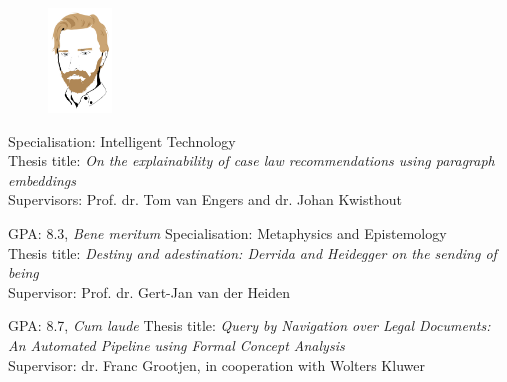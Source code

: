 \documentclass{cv}
\begin{document}
\begin{figure}
	\vspace*{-5em}
	\includegraphics[width=0.15\textwidth]{img/ejw.jpg}
\end{figure}

\baselinestretch


\sepspace





{Specialisation: Intelligent Technology\\
Thesis title: \emph{On the explainability of case law recommendations using paragraph embeddings}\\
Supervisors: Prof. dr. Tom van Engers and dr. Johan Kwisthout}

{GPA: 8.3, \emph{Bene meritum}}
{Specialisation: Metaphysics and Epistemology\\
Thesis title: \emph{Destiny and adestination: Derrida and Heidegger on the sending of being}\\
Supervisor: Prof. dr. Gert-Jan van der Heiden}

{GPA: 8.7, \emph{Cum laude}}
{Thesis title: \textit{Query by Navigation over Legal Documents:\\
An Automated Pipeline using Formal Concept Analysis} \\
Supervisor: dr. Franc Grootjen, in cooperation with Wolters Kluwer}
\end{document}
